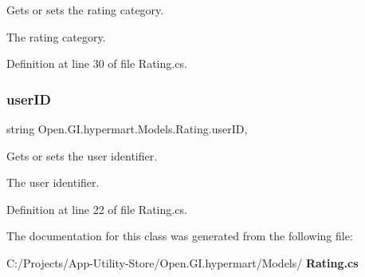 Gets or sets the rating category. 

The rating category. 

Definition at line 30 of file Rating.\+cs.

\mbox{\label{class_open_1_1_g_i_1_1hypermart_1_1_models_1_1_rating_a1e8a569cc68356a222db0eee305273f2}} 
\subsubsection{user\+ID}
{\footnotesize\ttfamily string Open.\+G\+I.\+hypermart.\+Models.\+Rating.\+user\+ID\hspace{0.3cm}{\ttfamily [get]}, {\ttfamily [set]}}



Gets or sets the user identifier. 

The user identifier. 

Definition at line 22 of file Rating.\+cs.



The documentation for this class was generated from the following file\+:\begin{DoxyCompactItemize}
\item 
C\+:/\+Projects/\+App-\/\+Utility-\/\+Store/\+Open.\+G\+I.\+hypermart/\+Models/\textbf{ Rating.\+cs}\end{DoxyCompactItemize}
